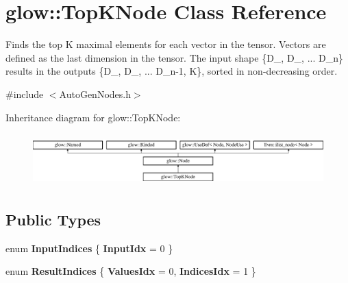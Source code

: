 \hypertarget{classglow_1_1_top_k_node}{}\section{glow\+:\+:Top\+K\+Node Class Reference}
\label{classglow_1_1_top_k_node}


Finds the top K maximal elements for each vector in the tensor. Vectors are defined as the last dimension in the tensor. The input shape \{D\+\_, D\+\_, ... D\+\_\+n\} results in the outputs \{D\+\_, D\+\_, ... D\+\_\+n-\/1, K\}, sorted in non-\/decreasing order.  




{\ttfamily \#include $<$Auto\+Gen\+Nodes.\+h$>$}

Inheritance diagram for glow\+:\+:Top\+K\+Node\+:\begin{figure}[H]
\begin{center}
\leavevmode
\includegraphics[height=2.028986cm]{classglow_1_1_top_k_node}
\end{center}
\end{figure}
\subsection*{Public Types}
\begin{DoxyCompactItemize}
\item 
\mbox{\label{classglow_1_1_top_k_node_a30f566569da863201d7974974b8bc1c9}} 
enum {\bfseries Input\+Indices} \{ {\bfseries Input\+Idx} = 0
 \}
\item 
\mbox{\label{classglow_1_1_top_k_node_af8a3d1e241736e8f28f5fc9283ec4464}} 
enum {\bfseries Result\+Indices} \{ {\bfseries Values\+Idx} = 0, 
{\bfseries Indices\+Idx} = 1
 \}
\end{DoxyCompactItemize}
